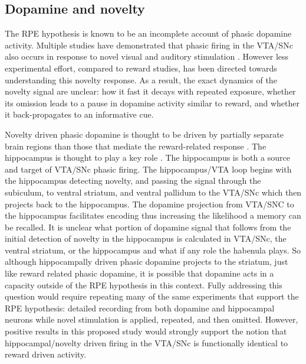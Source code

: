 \documentclass[doc]{apa}        %
\begin{document}
\subsection{Dopamine and novelty} %
\label{sub:dopamine_and_novelty}

The RPE hypothesis is known to be an incomplete account of phasic dopamine activity.  Multiple studies have demonstrated that phasic firing in the VTA/SNc also occurs in response to novel visual and auditory stimulation \cite{Zink:2004p5108,Reed:1996p7250,Blatter:2006p6372}. However less experimental effort, compared to reward studies, has been directed towards understanding this novelty response.  As a result, the exact dynamics of the novelty signal are unclear: how it fast it decays with repeated exposure, whether its omission leads to a pause in dopamine activity similar to reward, and whether it back-propagates to an informative cue.  

Novelty driven phasic dopamine is thought to be driven by partially separate brain regions than those that mediate the reward-related response \cite{Joel:2002p6593,Lisman:2005p5455}.  The hippocampus is thought to play a key role \cite{Lisman:2005p5455}.   The hippocampus is both a source and target of VTA/SNc phasic firing.  The hippocampus/VTA loop begins with the hippocampus detecting novelty, and passing the signal through the subiculum, to ventral striatum, and ventral pallidum to the VTA/SNc which then projects back to the hippocampus.   The dopamine projection from VTA/SNC to the hippocampus facilitates encoding thus increasing the likelihood a memory can be recalled.   It is unclear what portion of dopamine signal that follows from the initial detection of novelty in the hippocampus is calculated in VTA/SNc, the ventral striatum, or the hippocampus and what if any role the habenula plays.  So although hippocampally driven phasic dopamine projects to the striatum, just like reward related phasic dopamine, it is possible that dopamine acts in a capacity outside of the RPE hypothesis in this context.  Fully addressing this question would require repeating many of the same experiments that support the RPE hypothesis: detailed recording from both dopamine and hippocampal neurons while novel stimulation is applied, repeated, and then omitted.  However, positive results in this proposed study would strongly support the notion that hippocampal/novelty driven firing in the VTA/SNc is functionally identical to reward driven activity.
\end{document}
